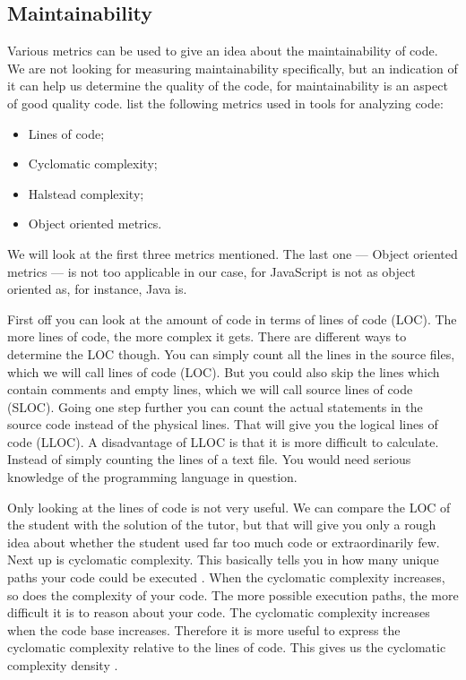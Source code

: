 \documentclass{article}
\begin{document}
\subsection{Maintainability}

Various metrics can be used to give an idea about the maintainability of
code. We are not looking for measuring maintainability specifically, but an
indication of it can help us determine the quality of the code, for
maintainability is an aspect of good quality code. \citet{rakic2013problems}
list the following metrics used in tools for analyzing code:
\begin{itemize}
  \item Lines of code;
  \item Cyclomatic complexity;
  \item Halstead complexity;
  \item Object oriented metrics.
\end{itemize}
We will look at the first three metrics mentioned. The last one --- Object
oriented metrics --- is not too applicable in our case, for JavaScript is not
as object oriented as, for instance, Java is.

First off you can look at the amount of code in terms of lines of code
(LOC). The more lines of code, the more complex it gets. There are different
ways to determine the LOC though. You can simply count all the lines in the
source files, which we will call lines of code (LOC). But you could also skip
the lines which contain comments and empty lines, which we will call source
lines of code (SLOC). Going one step further you can count the actual
statements in the source code instead of the physical lines. That will give
you the logical lines of code (LLOC). A disadvantage of LLOC is that it is more
difficult to calculate. Instead of simply counting the lines of a text
file. You would need serious knowledge of the programming language in question.

Only looking at the lines of code is not very useful. We can compare the LOC of
the student with the solution of the tutor, but that will give you only a
rough idea about whether the student used far too much code or extraordinarily
few. Next up is cyclomatic complexity. This basically tells you in how many
unique paths your code could be executed \citep{website:js-complexity}. When
the cyclomatic complexity increases, so does the complexity of your code. The
more possible execution paths, the more difficult it is to reason about your
code. The cyclomatic complexity increases when the code base
increases. Therefore it is more useful to express the cyclomatic complexity
relative to the lines of code. This gives us the cyclomatic complexity density
\citep{gill1991cyclomatic}.
\end{document}
